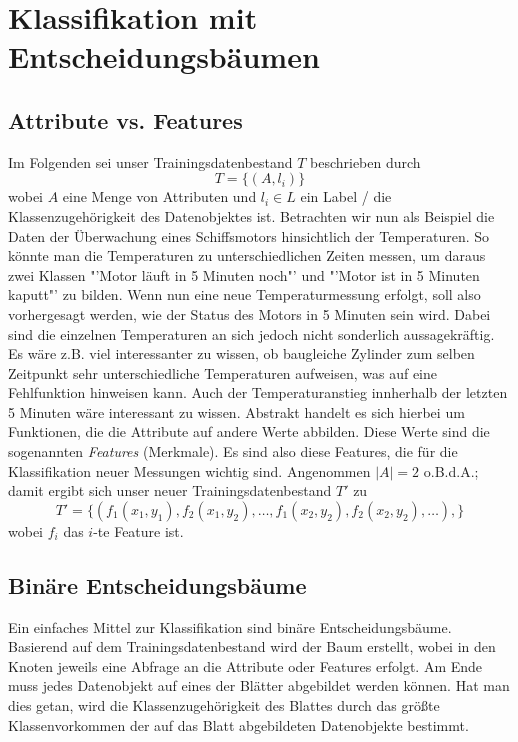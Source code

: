 \section{Klassifikation mit Entscheidungsbäumen}

\subsection{Attribute vs. Features}
Im Folgenden sei unser Trainingsdatenbestand \(T\) beschrieben durch
\[
	T = \{ (A, l_i) \}
\]
wobei \(A\) eine Menge von Attributen und \(l_i \in L\) ein Label / die
Klassenzugehörigkeit des Datenobjektes ist. Betrachten wir nun als Beispiel
die Daten der Überwachung eines Schiffsmotors hinsichtlich der Temperaturen.
So könnte man die Temperaturen zu unterschiedlichen Zeiten messen, um daraus
zwei Klassen "'Motor läuft in 5 Minuten noch"' und "'Motor ist in 5 Minuten
kaputt"' zu bilden. Wenn nun eine neue Temperaturmessung erfolgt, soll also
vorhergesagt werden, wie der Status des Motors in 5 Minuten sein wird.
Dabei sind die einzelnen Temperaturen an sich jedoch nicht sonderlich aussagekräftig.
Es wäre z.B. viel interessanter zu wissen, ob baugleiche Zylinder zum selben
Zeitpunkt sehr unterschiedliche Temperaturen aufweisen, was auf eine Fehlfunktion
hinweisen kann. Auch der Temperaturanstieg innherhalb der letzten 5 Minuten wäre
interessant zu wissen. Abstrakt handelt es sich hierbei um Funktionen, die 
die Attribute auf andere Werte abbilden. Diese Werte sind die sogenannten
\textit{Features} (Merkmale). Es sind also diese Features, die für die Klassifikation
neuer Messungen wichtig sind.
Angenommen \(|A| = 2\) o.B.d.A.; damit ergibt sich unser neuer Trainingsdatenbestand
\(T'\) zu
\[
	T' = \{ (f_1(x_1,y_1), f_2(x_1,y_2), \dots , f_1(x_2,y_2),f_2(x_2,y_2), \dots),\}
\]
wobei \(f_i\) das \(i\)-te Feature ist.

\subsection{Binäre Entscheidungsbäume}
Ein einfaches Mittel zur Klassifikation sind binäre Entscheidungsbäume. Basierend
auf dem Trainingsdatenbestand wird der Baum erstellt, wobei in den Knoten jeweils
eine Abfrage an die Attribute oder Features erfolgt. Am Ende muss jedes Datenobjekt
auf eines der Blätter abgebildet werden können. Hat man dies getan, wird die 
Klassenzugehörigkeit des Blattes durch das größte Klassenvorkommen der auf das
Blatt abgebildeten Datenobjekte bestimmt.

